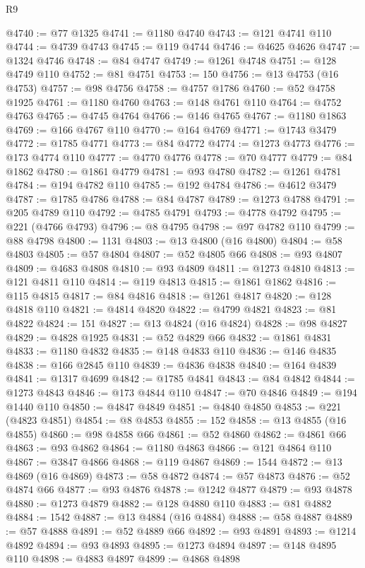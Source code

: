 \begin{lexlean}{R9}
\begin{coremodule}
@4740 := @77 @1325
@4741 := @1180 @4740
@4743 := @121 @4741 @110
@4744 := @4739 @4743
@4745 := @119 @4744
@4746 := @4625 @4626
@4747 := @1324 @4746
@4748 := @84 @4747
@4749 := @1261 @4748
@4751 := @128 @4749 @110
@4752 := @81 @4751
@4753 := 150
@4756 := @13 @4753 (@16 @4753)
@4757 := @98 @4756
@4758 := @4757 @1786
@4760 := @52 @4758 @1925
@4761 := @1180 @4760
@4763 := @148 @4761 @110
@4764 := @4752 @4763
@4765 := @4745 @4764
@4766 := @146 @4765
@4767 := @1180 @1863
@4769 := @166 @4767 @110
@4770 := @164 @4769
@4771 := @1743 @3479
@4772 := @1785 @4771
@4773 := @84 @4772
@4774 := @1273 @4773
@4776 := @173 @4774 @110
@4777 := @4770 @4776
@4778 := @70 @4777
@4779 := @84 @1862
@4780 := @1861 @4779
@4781 := @93 @4780
@4782 := @1261 @4781
@4784 := @194 @4782 @110
@4785 := @192 @4784
@4786 := @4612 @3479
@4787 := @1785 @4786
@4788 := @84 @4787
@4789 := @1273 @4788
@4791 := @205 @4789 @110
@4792 := @4785 @4791
@4793 := @4778 @4792
@4795 := @221 (@4766 @4793)
@4796 := @8 @4795
@4798 := @97 @4782 @110
@4799 := @88 @4798
@4800 := 1131
@4803 := @13 @4800 (@16 @4800)
@4804 := @58 @4803
@4805 := @57 @4804
@4807 := @52 @4805 @66
@4808 := @93 @4807
@4809 := @4683 @4808
@4810 := @93 @4809
@4811 := @1273 @4810
@4813 := @121 @4811 @110
@4814 := @119 @4813
@4815 := @1861 @1862
@4816 := @115 @4815
@4817 := @84 @4816
@4818 := @1261 @4817
@4820 := @128 @4818 @110
@4821 := @4814 @4820
@4822 := @4799 @4821
@4823 := @81 @4822
@4824 := 151
@4827 := @13 @4824 (@16 @4824)
@4828 := @98 @4827
@4829 := @4828 @1925
@4831 := @52 @4829 @66
@4832 := @1861 @4831
@4833 := @1180 @4832
@4835 := @148 @4833 @110
@4836 := @146 @4835
@4838 := @166 @2845 @110
@4839 := @4836 @4838
@4840 := @164 @4839
@4841 := @1317 @4699
@4842 := @1785 @4841
@4843 := @84 @4842
@4844 := @1273 @4843
@4846 := @173 @4844 @110
@4847 := @70 @4846
@4849 := @194 @1440 @110
@4850 := @4847 @4849
@4851 := @4840 @4850
@4853 := @221 (@4823 @4851)
@4854 := @8 @4853
@4855 := 152
@4858 := @13 @4855 (@16 @4855)
@4860 := @98 @4858 @66
@4861 := @52 @4860
@4862 := @4861 @66
@4863 := @93 @4862
@4864 := @1180 @4863
@4866 := @121 @4864 @110
@4867 := @3847 @4866
@4868 := @119 @4867
@4869 := 1544
@4872 := @13 @4869 (@16 @4869)
@4873 := @58 @4872
@4874 := @57 @4873
@4876 := @52 @4874 @66
@4877 := @93 @4876
@4878 := @1242 @4877
@4879 := @93 @4878
@4880 := @1273 @4879
@4882 := @128 @4880 @110
@4883 := @81 @4882
@4884 := 1542
@4887 := @13 @4884 (@16 @4884)
@4888 := @58 @4887
@4889 := @57 @4888
@4891 := @52 @4889 @66
@4892 := @93 @4891
@4893 := @1214 @4892
@4894 := @93 @4893
@4895 := @1273 @4894
@4897 := @148 @4895 @110
@4898 := @4883 @4897
@4899 := @4868 @4898

\end{coremodule}
\end{lexlean}
